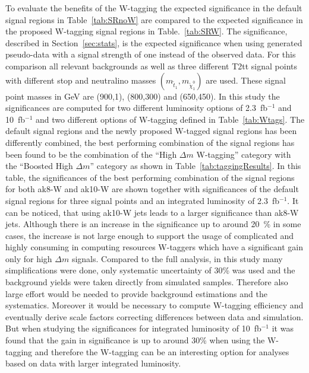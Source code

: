 To evaluate the benefits of the W-tagging the expected significance in the default signal regions in Table~\ref{tab:SRnoW} are compared to the expected significance in the proposed W-tagging signal regions in Table.~\ref{tab:SRW}. The significance, described in Section~\ref{sec:stats}, is the expected significance when using generated pseudo-data with a signal strength of one instead of the observed data. For this comparison all relevant backgrounds as well as three different T2tt signal points with different stop and neutralino masses $(m_{\tilde{t}_{1}}, m_{\tilde{\chi}^{0}_{1}})$ are used. These signal point masses in GeV are (900,1), (800,300) and (650,450). In this study the significances are computed for two different luminosity options of 2.3~fb$^{-1}$ and 10~fb$^{-1}$ and two different options of W-tagging defined in Table~\ref{tab:Wtags}. The default signal regions and the newly proposed W-tagged signal regions has been differently combined, the best performing combination of the signal regions has been found to be the combination of the ``High $\Delta m$ W-tagging'' category with the ``Boosted High $\Delta m$'' category as shown in Table~\ref{tab:taggingResults}. In this table, the significances of the best performing combination of the signal regions for both ak8-W and ak10-W are shown together with significances of the default signal regions for three signal points and an integrated luminosity of 2.3~fb$^{-1}$. It can be noticed, that using ak10-W jets leads to a larger significance than ak8-W jets. Although there is an increase in the significance up to around 20~\% in some cases, the increase is not large enough to support the usage of complicated and highly consuming in computing resources W-taggers which have a significant gain only for high $\Delta m$ signals.  Compared to the full analysis, in this study many simplifications were done, only systematic uncertainty of 30\% was used and the background yields were taken directly from simulated samples. Therefore also large effort would be needed to provide background estimations and the systematics. Moreover it would be necessary to compute W-tagging efficiency and eventually  derive scale factors correcting differences between data and simulation.  But when studying the significances for integrated luminosity of  10~fb$^{-1}$  it was found that the gain in significance is up to around 30\% when using the W-tagging and therefore the W-tagging can be an interesting option for analyses based on data with larger integrated luminosity. 

